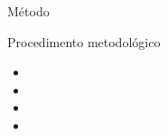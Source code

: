 \begin{frame}{Método}
    \begin{block}{Procedimento metodológico}
        \begin{itemize}
            \item
            \item
            \item
            \item
        \end{itemize}
    \end{block}
\end{frame}
